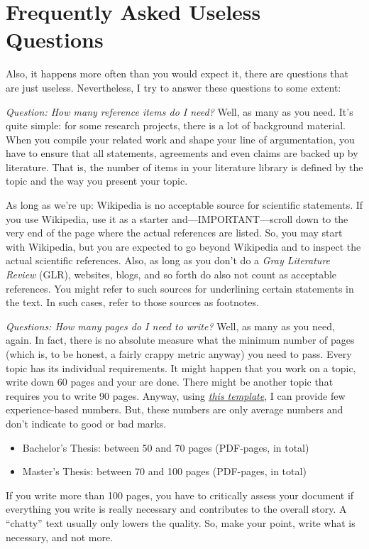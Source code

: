 \section{Frequently Asked Useless Questions}
\label{sec:03:FUQ}
Also, it happens more often than you would expect it, there are questions that are just useless. Nevertheless, I try to answer these questions to some extent:

\emph{Question: How many reference items do I need?} Well, as many as you need. It's quite simple: for some research projects, there is a lot of background material. When you compile your related work and shape your line of argumentation, you have to ensure that all statements, agreements and even claims are backed up by literature. That is, the number of items in your literature library is defined by the topic and the way you present your topic.

\begin{MySugg}
	As long as we're up: Wikipedia is no acceptable source for scientific statements. If you use Wikipedia, use it as a starter and---IMPORTANT---scroll down to the very end of the page where the actual references are listed. So, you may start with Wikipedia, but you are expected to go beyond Wikipedia and to inspect the actual scientific references. Also, as long as you don't do a \emph{Gray Literature Review} (GLR), websites, blogs, and so forth do also not count as acceptable references. You might refer to such sources for underlining certain statements in the text. In such cases, refer to those sources as footnotes.
\end{MySugg}

\emph{Questions: How many pages do I need to write?} Well, as many as you need, again. In fact, there is no absolute measure what the minimum number of pages (which is, to be honest, a fairly crappy metric anyway) you need to pass. Every topic has its individual requirements. It might happen that you work on a topic, write down 60 pages and your are done. There might be another topic that requires you to write 90 pages. Anyway, using \emph{\underline{this template}}, I can provide few experience-based numbers. But, these numbers are only average numbers and don't indicate to good or bad marks.
\begin{itemize}
	\item Bachelor's Thesis: between 50 and 70 pages (PDF-pages, in total)
	\item Master's Thesis: between 70 and 100 pages (PDF-pages, in total)
\end{itemize}
If you write more than 100 pages, you have to critically assess your document if everything you write is really necessary and contributes to the overall story. A ``chatty'' text usually only lowers the quality. So, make your point, write what is necessary, and not more.

